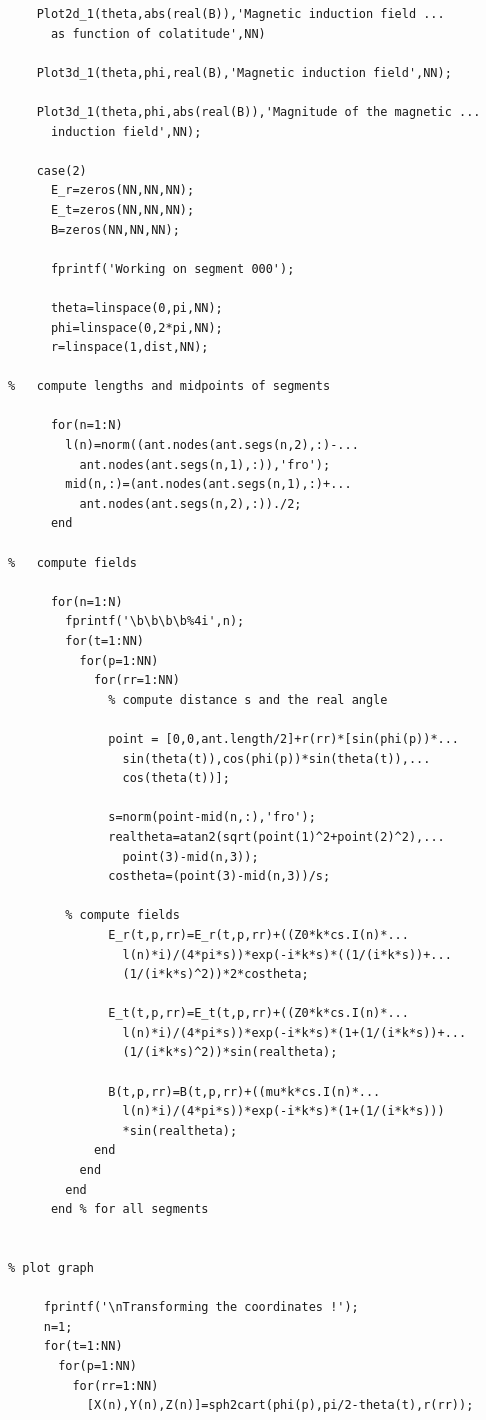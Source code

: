 \documentclass[a4paper,11pt]{thesis}
\begin{document}
\begin{verbatim}
    Plot2d_1(theta,abs(real(B)),'Magnetic induction field ...
      as function of colatitude',NN)

    Plot3d_1(theta,phi,real(B),'Magnetic induction field',NN);

    Plot3d_1(theta,phi,abs(real(B)),'Magnitude of the magnetic ...
      induction field',NN);

    case(2)
      E_r=zeros(NN,NN,NN);
      E_t=zeros(NN,NN,NN);
      B=zeros(NN,NN,NN);

      fprintf('Working on segment 000');

      theta=linspace(0,pi,NN);
      phi=linspace(0,2*pi,NN);
      r=linspace(1,dist,NN);

%   compute lengths and midpoints of segments

      for(n=1:N)
        l(n)=norm((ant.nodes(ant.segs(n,2),:)-...
          ant.nodes(ant.segs(n,1),:)),'fro');
        mid(n,:)=(ant.nodes(ant.segs(n,1),:)+...
          ant.nodes(ant.segs(n,2),:))./2;
      end

%   compute fields

      for(n=1:N)
        fprintf('\b\b\b\b%4i',n);
        for(t=1:NN)
          for(p=1:NN)
            for(rr=1:NN)
              % compute distance s and the real angle

              point = [0,0,ant.length/2]+r(rr)*[sin(phi(p))*...
                sin(theta(t)),cos(phi(p))*sin(theta(t)),...
                cos(theta(t))];

              s=norm(point-mid(n,:),'fro');
              realtheta=atan2(sqrt(point(1)^2+point(2)^2),...
                point(3)-mid(n,3));
              costheta=(point(3)-mid(n,3))/s;

	    % compute fields
              E_r(t,p,rr)=E_r(t,p,rr)+((Z0*k*cs.I(n)*...
                l(n)*i)/(4*pi*s))*exp(-i*k*s)*((1/(i*k*s))+...
                (1/(i*k*s)^2))*2*costheta;

              E_t(t,p,rr)=E_t(t,p,rr)+((Z0*k*cs.I(n)*...
                l(n)*i)/(4*pi*s))*exp(-i*k*s)*(1+(1/(i*k*s))+...
                (1/(i*k*s)^2))*sin(realtheta);

              B(t,p,rr)=B(t,p,rr)+((mu*k*cs.I(n)*...
                l(n)*i)/(4*pi*s))*exp(-i*k*s)*(1+(1/(i*k*s)))
                *sin(realtheta);
            end
          end
        end
      end % for all segments


% plot graph

     fprintf('\nTransforming the coordinates !');
     n=1;
     for(t=1:NN)
       for(p=1:NN)
         for(rr=1:NN)
           [X(n),Y(n),Z(n)]=sph2cart(phi(p),pi/2-theta(t),r(rr));


\end{verbatim}
\end{document}
